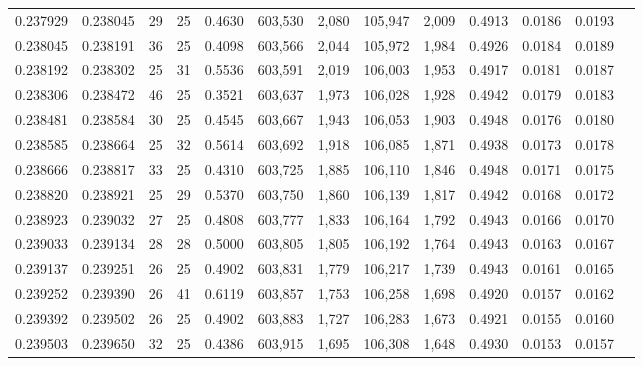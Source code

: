 \begin{tabular}{rrrrrrrrrrrrr}
0.237929 & 0.238045 &  29 &  25 &                                     0.4630 & 603,530 &   2,080 & 105,947 &   2,009 & 0.4913 & 0.0186 & 0.0193 \\
0.238045 & 0.238191 &  36 &  25 &                                     0.4098 & 603,566 &   2,044 & 105,972 &   1,984 & 0.4926 & 0.0184 & 0.0189 \\
0.238192 & 0.238302 &  25 &  31 &                                     0.5536 & 603,591 &   2,019 & 106,003 &   1,953 & 0.4917 & 0.0181 & 0.0187 \\
0.238306 & 0.238472 &  46 &  25 &                                     0.3521 & 603,637 &   1,973 & 106,028 &   1,928 & 0.4942 & 0.0179 & 0.0183 \\
0.238481 & 0.238584 &  30 &  25 &                                     0.4545 & 603,667 &   1,943 & 106,053 &   1,903 & 0.4948 & 0.0176 & 0.0180 \\
0.238585 & 0.238664 &  25 &  32 &                                     0.5614 & 603,692 &   1,918 & 106,085 &   1,871 & 0.4938 & 0.0173 & 0.0178 \\
0.238666 & 0.238817 &  33 &  25 &                                     0.4310 & 603,725 &   1,885 & 106,110 &   1,846 & 0.4948 & 0.0171 & 0.0175 \\
0.238820 & 0.238921 &  25 &  29 &                                     0.5370 & 603,750 &   1,860 & 106,139 &   1,817 & 0.4942 & 0.0168 & 0.0172 \\
0.238923 & 0.239032 &  27 &  25 &                                     0.4808 & 603,777 &   1,833 & 106,164 &   1,792 & 0.4943 & 0.0166 & 0.0170 \\
0.239033 & 0.239134 &  28 &  28 &                                     0.5000 & 603,805 &   1,805 & 106,192 &   1,764 & 0.4943 & 0.0163 & 0.0167 \\
0.239137 & 0.239251 &  26 &  25 &                                     0.4902 & 603,831 &   1,779 & 106,217 &   1,739 & 0.4943 & 0.0161 & 0.0165 \\
0.239252 & 0.239390 &  26 &  41 &                                     0.6119 & 603,857 &   1,753 & 106,258 &   1,698 & 0.4920 & 0.0157 & 0.0162 \\
0.239392 & 0.239502 &  26 &  25 &                                     0.4902 & 603,883 &   1,727 & 106,283 &   1,673 & 0.4921 & 0.0155 & 0.0160 \\
0.239503 & 0.239650 &  32 &  25 &                                     0.4386 & 603,915 &   1,695 & 106,308 &   1,648 & 0.4930 & 0.0153 & 0.0157 \\

\end{tabular}
